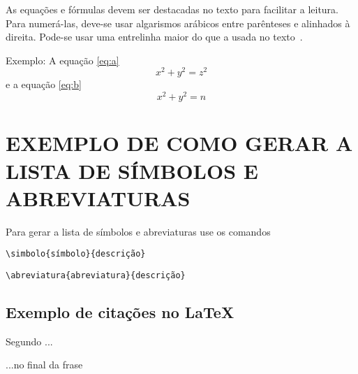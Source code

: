As equações e fórmulas
devem ser destacadas no texto
para facilitar a leitura.
Para numerá-las,
deve-se usar algarismos arábicos entre parênteses
e alinhados à direita.
Pode-se usar uma entrelinha maior do que a usada no texto~\cite{abnt14724}.

Exemplo: A equação \ref{eq:a}
\begin{equation}
    x^2 + y^2 = z^2
    \label{eq:a}
\end{equation}
 e a equação \ref{eq:b}
\begin{equation}
    x^2 + y^2 = n
    \label{eq:b}
\end{equation}

\section{EXEMPLO DE COMO GERAR A LISTA DE SÍMBOLOS E ABREVIATURAS}

Para gerar a lista de símbolos e abreviaturas use os comandos


\begin{lstlisting}
\simbolo{símbolo}{descrição}
\end{lstlisting}

\begin{lstlisting}
\abreviatura{abreviatura}{descrição}
\end{lstlisting}

\subsection{Exemplo de citações no \LaTeX}

Segundo  ...

...no final da frase \cite{abnt14724,BU_formatoA5}

\nocite{alves_2001,abnt10520,abnt6024,abnt14724}
